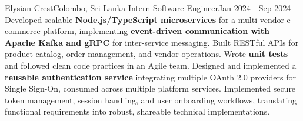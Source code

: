     \resumeSubheading
      {Elysian Crest}{Colombo, Sri Lanka}
      {Intern Software Engineer}{Jan 2024 - Sep 2024}
      \resumeItemListStart
          {Developed scalable \textbf{Node.js/TypeScript microservices} for a multi-vendor e-commerce platform, implementing \textbf{event-driven communication with Apache Kafka and gRPC} for inter-service messaging. Built RESTful APIs for product catalog, order management, and vendor operations. Wrote \textbf{unit tests} and followed clean code practices in an Agile team.}
          {Designed and implemented a \textbf{reusable authentication service} integrating multiple OAuth 2.0 providers for Single Sign-On, consumed across multiple platform services. Implemented secure token management, session handling, and user onboarding workflows, translating functional requirements into robust, shareable technical implementations.}
      \resumeItemListEnd

  \resumeSubHeadingListEnd
